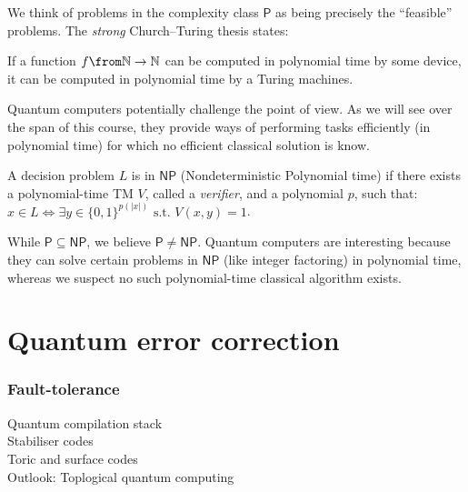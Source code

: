 \documentclass[a4paper,oneside, 12pt]{amsart}
\newcommand*{\Pclass}{\ensuremath{\mathsf{P}}}
\newcommand*{\NPclass}{\ensuremath{\mathsf{NP}}}
\begin{document}
We think of problems in the complexity class \(\Pclass\) as being precisely the  ``feasible'' problems.
The \emph{strong} Church--Turing thesis states:
\begin{remark}\label{rmk:strong-Church-Turing-thesis}
  If a function \(f \from \mathbb{N} \to \mathbb{N}\) can be computed in polynomial time by some device, it can be computed in polynomial time by a Turing machines.
\end{remark}

Quantum computers potentially challenge the point of view.
As we will see over the span of this course, they provide ways of performing tasks efficiently (in polynomial time) for which no efficient classical solution is know.

\begin{definition}\label{def:class-np}
  A decision problem \(L\) is in \(\NPclass\) (Nondeterministic Polynomial time) if there exists a polynomial-time TM \(V\), called a \emph{verifier}, and a polynomial \(p\), such that:
  \(x \in L \iff \exists y \in \{0,1\}^{p(|x|)} \text{ s.t. } V(x, y) = 1\).
\end{definition}

\begin{remark}
  While \(\Pclass \subseteq \NPclass\), we believe \(\Pclass \neq \NPclass\). Quantum computers are interesting because they can solve certain problems in \(\NPclass\) (like integer factoring) in polynomial time, whereas we suspect no such polynomial-time classical algorithm exists.
\end{remark}

\part{Quantum error correction}
\section{Fault-tolerance}\label{sec:fault-tolerance}
\begin{description}
  \item[Quantum compilation stack]
  \item[Stabiliser codes]
  \item[Toric and surface codes]
  \item[Outlook: Toplogical quantum computing]
\end{description}
\end{document}

